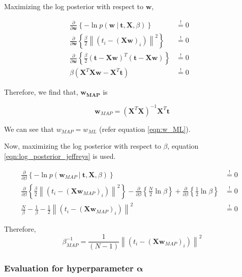 \documentclass[11pt]{article}
\newcommand\given[1][]{\:#1\vert\:}
\newcommand{\norm}[1]{\left\lVert#1\right\rVert}
\begin{document}
Maximizing the log posterior with respect to $\bm{w}$,

\begin{eqnarray}
    \frac{\partial }{\partial  \bm{w}} \left\{ -\ln{p(\bm{w} \given \bm{t}, \bm{X}, \beta)} \right\} 
    &\overset{!}{=} 0& \\
    \frac{\partial }{\partial \bm{w}} \left\{\frac{\beta}{2} \norm{\left(t_i - (\bm{X}\bm{w})_i\right)}^2  \right\}
    &\overset{!}{=} 0& \\
    \frac{\partial }{\partial \bm{w}} \left\{\frac{\beta}{2} \left(\bm{t} - \bm{X}\bm{w}\right)^T \left(\bm{t} - \bm{X}\bm{w}\right) \right\}
    &\overset{!}{=} 0& \\
    \beta \left( \bm{X}^T\bm{X}\bm{w} - \bm{X}^T \bm{t} \right) 
    &\overset{!}{=} 0& 
\end{eqnarray}

Therefore, we find that, $\bm{w_{MAP}}$ is

\begin{equation}
    \bm{w}_{MAP} = (\bm{X}^T \bm{X})^{-1} \bm{X}^T \bm{t}
\end{equation}

We can see that $w_{MAP} = w_{ML}$ (refer equation \ref{eqn:w_ML}). 

Now, maximizing the log posterior with respect to $\beta$, equation \ref{eqn:log_posterior_jeffreys} is used.

\begin{eqnarray}
    \frac{\partial }{\partial  \beta} \left\{ -\ln{p(\bm{w}_{MAP} \given \bm{t}, \bm{X}, \beta)} \right\} 
    &\overset{!}{=} 0& \\
    \frac{\partial }{\partial \beta} \left\{\frac{\beta}{2} \norm{\left(t_i - (\bm{X}\bm{w}_{MAP})_i\right)}^2  \right\}
    - \frac{\partial }{\partial \beta} \left\{\frac{N}{2}\ln{\beta} \right\} + \frac{\partial }{\partial \beta} \left\{\frac{1}{2} \ln{\beta} \right\}
    &\overset{!}{=} 0& \\
    \frac{N}{\beta} -\frac{1}{\beta} - \frac{1}{2} \norm{\left(t_i - (\bm{X}\bm{w}_{MAP})_i\right)}^2
    &\overset{!}{=} 0&
\end{eqnarray}

Therefore, 
\begin{equation}
    \beta_{MAP}^{-1} = \frac{1}{\left(N-1\right)}\norm{\left(t_i - (\bm{X}\bm{w}_{MAP})_i\right)}^2
\end{equation}

\subsubsection{Evaluation for hyperparameter $\bm{\alpha}$}
\end{document}
